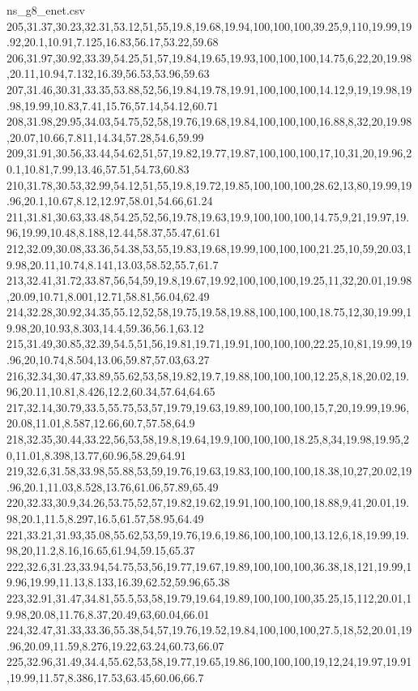 \begin{filecontents*}[overwrite]{ns_g8_enet.csv}
205,31.37,30.23,32.31,53.12,51,55,19.8,19.68,19.94,100,100,100,39.25,9,110,19.99,19.92,20.1,10.91,7.125,16.83,56.17,53.22,59.68
206,31.97,30.92,33.39,54.25,51,57,19.84,19.65,19.93,100,100,100,14.75,6,22,20,19.98,20.11,10.94,7.132,16.39,56.53,53.96,59.63
207,31.46,30.31,33.35,53.88,52,56,19.84,19.78,19.91,100,100,100,14.12,9,19,19.98,19.98,19.99,10.83,7.41,15.76,57.14,54.12,60.71
208,31.98,29.95,34.03,54.75,52,58,19.76,19.68,19.84,100,100,100,16.88,8,32,20,19.98,20.07,10.66,7.811,14.34,57.28,54.6,59.99
209,31.91,30.56,33.44,54.62,51,57,19.82,19.77,19.87,100,100,100,17,10,31,20,19.96,20.1,10.81,7.99,13.46,57.51,54.73,60.83
210,31.78,30.53,32.99,54.12,51,55,19.8,19.72,19.85,100,100,100,28.62,13,80,19.99,19.96,20.1,10.67,8.12,12.97,58.01,54.66,61.24
211,31.81,30.63,33.48,54.25,52,56,19.78,19.63,19.9,100,100,100,14.75,9,21,19.97,19.96,19.99,10.48,8.188,12.44,58.37,55.47,61.61
212,32.09,30.08,33.36,54.38,53,55,19.83,19.68,19.99,100,100,100,21.25,10,59,20.03,19.98,20.11,10.74,8.141,13.03,58.52,55.7,61.7
213,32.41,31.72,33.87,56,54,59,19.8,19.67,19.92,100,100,100,19.25,11,32,20.01,19.98,20.09,10.71,8.001,12.71,58.81,56.04,62.49
214,32.28,30.92,34.35,55.12,52,58,19.75,19.58,19.88,100,100,100,18.75,12,30,19.99,19.98,20,10.93,8.303,14.4,59.36,56.1,63.12
215,31.49,30.85,32.39,54.5,51,56,19.81,19.71,19.91,100,100,100,22.25,10,81,19.99,19.96,20,10.74,8.504,13.06,59.87,57.03,63.27
216,32.34,30.47,33.89,55.62,53,58,19.82,19.7,19.88,100,100,100,12.25,8,18,20.02,19.96,20.11,10.81,8.426,12.2,60.34,57.64,64.65
217,32.14,30.79,33.5,55.75,53,57,19.79,19.63,19.89,100,100,100,15,7,20,19.99,19.96,20.08,11.01,8.587,12.66,60.7,57.58,64.9
218,32.35,30.44,33.22,56,53,58,19.8,19.64,19.9,100,100,100,18.25,8,34,19.98,19.95,20,11.01,8.398,13.77,60.96,58.29,64.91
219,32.6,31.58,33.98,55.88,53,59,19.76,19.63,19.83,100,100,100,18.38,10,27,20.02,19.96,20.1,11.03,8.528,13.76,61.06,57.89,65.49
220,32.33,30.9,34.26,53.75,52,57,19.82,19.62,19.91,100,100,100,18.88,9,41,20.01,19.98,20.1,11.5,8.297,16.5,61.57,58.95,64.49
221,33.21,31.93,35.08,55.62,53,59,19.76,19.6,19.86,100,100,100,13.12,6,18,19.99,19.98,20,11.2,8.16,16.65,61.94,59.15,65.37
222,32.6,31.23,33.94,54.75,53,56,19.77,19.67,19.89,100,100,100,36.38,18,121,19.99,19.96,19.99,11.13,8.133,16.39,62.52,59.96,65.38
223,32.91,31.47,34.81,55.5,53,58,19.79,19.64,19.89,100,100,100,35.25,15,112,20.01,19.98,20.08,11.76,8.37,20.49,63,60.04,66.01
224,32.47,31.33,33.36,55.38,54,57,19.76,19.52,19.84,100,100,100,27.5,18,52,20.01,19.96,20.09,11.59,8.276,19.22,63.24,60.73,66.07
225,32.96,31.49,34.4,55.62,53,58,19.77,19.65,19.86,100,100,100,19,12,24,19.97,19.91,19.99,11.57,8.386,17.53,63.45,60.06,66.7

\end{filecontents*}
